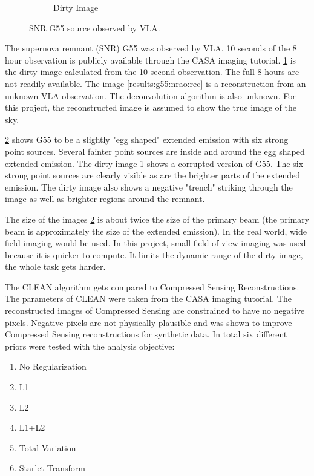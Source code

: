 \begin{figure}[h]
\begin{subfigure}[b]{0.45\linewidth}
		\caption{Dirty Image}
		\label{results:g55:nrao:dirty}
	\end{subfigure}
	\caption{SNR G55 source observed by VLA.}
	\label{results:g55:nrao}
\end{figure}

The supernova remnant (SNR) G55 was observed by VLA. 10 seconds of the 8 hour observation is publicly available through the CASA imaging tutorial\cite{casaImagingGuide}. \ref{results:g55:nrao:dirty} is the dirty image calculated from the 10 second observation. The full 8 hours are not readily available. The image \ref{results:g55:nrao:rec} is a reconstruction from an unknown VLA observation. The deconvolution algorithm is also unknown. For this project, the reconstructed image is assumed to show the true image of the sky.

\ref{results:g55:nrao} shows G55 to be a slightly "egg shaped" extended emission with six strong point sources. Several fainter point sources are inside and around the egg shaped extended emission. The dirty image \ref{results:g55:nrao:dirty} shows a corrupted version of G55. The six strong point sources are clearly visible as are the brighter parts of the extended emission. The dirty image also shows a negative "trench" striking through the image as well as brighter regions around the remnant. 

The size of the images \ref{results:g55:nrao} is about twice the size of the primary beam (the primary beam is approximately the size of the extended emission). In the real world, wide field imaging would be used. In this project, small field of view imaging was used because it is quicker to compute. 
It limits the dynamic range of the dirty image, the whole task gets harder. 

The CLEAN algorithm gets compared to Compressed Sensing Reconstructions. The parameters of CLEAN were taken from the CASA imaging tutorial\cite{casaImagingGuide}. The reconstructed images of Compressed Sensing are constrained to have no negative pixels. Negative pixels are not physically plausible and was shown to improve Compressed Sensing reconstructions for synthetic data\cite{mcewen2011compressed}. In total six different priors were tested with the analysis objective:
\begin{enumerate}
	\item No Regularization
	\item L1
	\item L2
	\item L1+L2
	\item Total Variation
	\item Starlet Transform
\end{enumerate}

